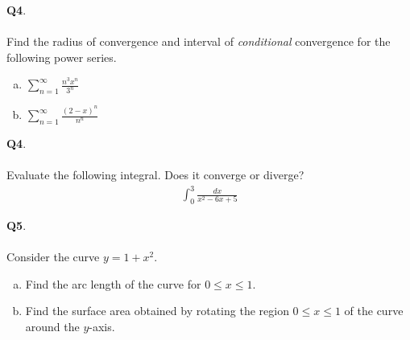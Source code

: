 \documentclass[12pt, oneside]{amsart}
\begin{document}
\newpage
\noindent
\textbf{Q4}. \\ \\ Find the radius of convergence and interval of \emph{conditional} convergence for the following power series.
\begin{enumerate}[a)]
  \item
$\displaystyle{\sum_{n=1}^{\infty} \frac{n^{3} x^{n}}{3^{n}}}$
    \vspace{6cm}
  \item
  $ \displaystyle{\sum_{n=1}^{\infty} \frac{{(2-x)^{n}}}{n^{n}}}$
  \newpage
\end{enumerate}

\noindent
\textbf{Q4}. \\ \\ Evaluate the following integral. Does it converge or diverge?
\vspace{1cm}
\begin{gather*}
  \int_{0}^{3} \frac{dx}{x^{2} -6x + 5}
\end{gather*}

\newpage
\noindent
\textbf{Q5}. \\ \\ 
Consider the curve $y=1 + x^{2}$.
\vspace{1cm}
\begin{enumerate}[a)]
  \item Find the arc length of the curve for $0 \le x \le 1$.
    \vspace{6cm}
  \item Find the surface area obtained by rotating the region $0 \le x \le 1$ of the curve around the $y$-axis.
\end{enumerate}
\end{document}
